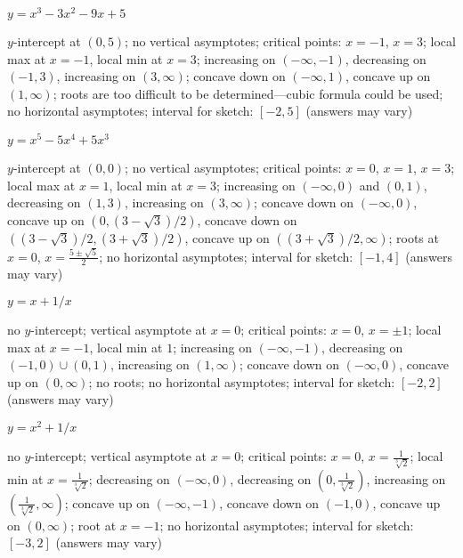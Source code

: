 \begin{exercises}
\begin{exercise} $y=x^3-3x^2-9x+5$
\begin{answer}
$y$-intercept at $(0,5)$; no vertical asymptotes; critical points:
  $x=-1$, $x= 3$; local max at $x=-1$, local min at $x=3$; increasing
  on $(-\infty,-1)$, decreasing on $(-1,3)$, increasing on
  $(3,\infty)$; concave down on $(-\infty,1)$, concave up on $(1,
  \infty)$; roots are too difficult to be determined---cubic formula
  could be used; no horizontal asymptotes; interval for sketch:
  $[-2,5]$ (answers may vary)
\end{answer}
\end{exercise}


\begin{exercise} $y=x^5-5x^4+5x^3$
\begin{answer}
$y$-intercept at $(0,0)$; no vertical asymptotes; critical points:
  $x=0$, $x=1$, $x=3$; local max at $x=1$, local min at $x=3$;
  increasing on $(-\infty,0)$ and $(0,1)$, decreasing on $(1,3)$,
  increasing on $(3,\infty)$; concave down on $(-\infty,0)$, concave
  up on $(0, (3-\sqrt{3})/2)$, concave down on
  $((3-\sqrt{3})/2,(3+\sqrt{3})/2)$, concave up on
  $((3+\sqrt{3})/2,\infty)$; roots at $x=0$, $x= \frac{5\pm
    \sqrt{5}}{2}$; no horizontal asymptotes; interval for sketch:
  $[-1,4]$ (answers may vary)
\end{answer}
\end{exercise}


\begin{exercise} $y = x+ 1/x$
\begin{answer}
no $y$-intercept; vertical asymptote at $x=0$; critical points: $x=0$,
$x=\pm 1$; local max at $x=-1$, local min at $1$; increasing on
$(-\infty,-1)$, decreasing on $(-1,0)\cup(0,1)$, increasing on
$(1,\infty)$; concave down on $(-\infty,0)$, concave up on $(0,
\infty)$; no roots; no horizontal asymptotes; interval for sketch:
$[-2,2]$ (answers may vary)
\end{answer}
\end{exercise}

\begin{exercise} $y = x^2+ 1/x$
\begin{answer}
no $y$-intercept; vertical asymptote at $x=0$; critical points: $x=0$,
$x=\frac{1}{\sqrt[3]{2}}$; local min at $x=\frac{1}{\sqrt[3]{2}}$;
decreasing on $(-\infty,0)$, decreasing on
$(0,\frac{1}{\sqrt[3]{2}})$, increasing on
$(\frac{1}{\sqrt[3]{2}},\infty)$; concave up on $(-\infty,-1)$,
concave down on $(-1,0)$, concave up on $(0,\infty)$; root at $x=-1$;
no horizontal asymptotes; interval for sketch: $[-3,2]$ (answers may
vary)
\end{answer}
\end{exercise}





\endtwocol

\end{exercises}
